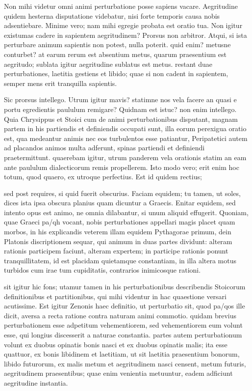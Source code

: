  Non mihi videtur omni animi perturbatione posse sapiens vacare. Aegritudine quidem hesterna disputatione videbatur, nisi forte temporis causa nobis adsentiebare. Minime vero; nam mihi egregie probata est oratio tua. Non igitur existumas cadere in sapientem aegritudinem? Prorsus non arbitror. Atqui, si ista perturbare animum sapientis non potest, nulla poterit. quid enim? metusne conturbet? at earum rerum est absentium metus, quarum praesentium est aegritudo; sublata igitur aegritudine sublatus est metus. restant duae perturbationes, laetitia gestiens et libido; quae si non cadent in sapientem, semper mens erit tranquilla sapientis.

 Sic prorsus intellego. Utrum igitur mavis? statimne nos vela facere an quasi e portu egredientis paululum remigare? Quidnam est istuc? non enim intellego. Quia Chrysippus et Stoici cum de animi perturbationibus disputant, magnam partem in his partiendis et definiendis occupati sunt, illa eorum perexigua oratio est, qua medeantur animis nec eos turbulentos esse patiantur, Peripatetici autem ad placandos animos multa adferunt, spinas partiendi et definiendi praetermittunt. quaerebam igitur, utrum panderem vela orationis statim an eam ante paululum dialecticorum remis propellerem. Isto modo vero; erit enim hoc totum, quod quaero, ex utroque perfectius. Est id quidem rectius;

 sed post requires, si quid fuerit obscurius. Faciam equidem; tu tamen, ut soles, dices ista ipsa obscura planius quam dicuntur a Graecis. Enitar equidem, sed intento opus est animo, ne omnia dilabantur, si unum aliquid effugerit. Quoniam, quae Graeci pa/qh vocant, nobis perturbationes appellari magis placet quam morbos, in his explicandis veterem illam equidem Pythagorae primum, dein Platonis discriptionem sequar, qui animum in duas partes dividunt: alteram rationis participem faciunt, alteram expertem; in participe rationis ponunt tranquillitatem, id est placidam quietamque constantiam, in illa altera motus turbidos cum irae tum cupiditatis, contrarios inimicosque rationi.

 sit igitur hic fons; utamur tamen in his perturbationibus describendis Stoicorum definitionibus et partitionibus, qui mihi videntur in hac quaestione versari acutissime. Est igitur Zenonis haec definitio, ut perturbatio sit, quod pa/qos ille dicit, aversa a recta ratione contra naturam animi commotio. quidam brevius perturbationem esse adpetitum vehementiorem, sed vehementiorem eum volunt esse, qui longius discesserit a naturae constantia. partes autem perturbationum volunt ex duobus opinatis bonis nasci et ex duobus opinatis malis; ita esse quattuor, ex bonis libidinem et laetitiam, ut sit laetitia praesentium bonorum, libido futurorum, ex malis metum et aegritudinem nasci censent, metum futuris, aegritudinem praesentibus; quae enim venientia metuuntur, eadem adficiunt aegritudine instantia.

